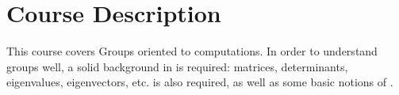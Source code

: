 \section{Course Description}

This course covers Groups oriented to computations. In order to understand groups well, a solid background in  is required: matrices, determinants, eigenvalues, eigenvectors, etc.  is also required, as well as some basic notions of . 